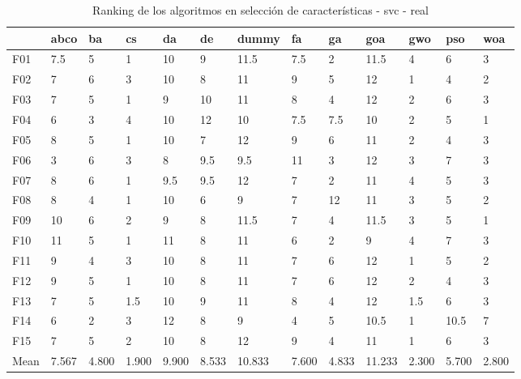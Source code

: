 \begin{table}
    \centering
    \begin{adjustbox}{width=\linewidth}
        \begin{tabular}{lllllllllllll}
            \toprule
            {}   & abco  & ba    & cs    & da    & de    & dummy  & fa    & ga    & goa    & gwo   & pso   & woa   \\
            \midrule
            F01  & 7.5   & 5     & 1     & 10    & 9     & 11.5   & 7.5   & 2     & 11.5   & 4     & 6     & 3     \\
            F02  & 7     & 6     & 3     & 10    & 8     & 11     & 9     & 5     & 12     & 1     & 4     & 2     \\
            F03  & 7     & 5     & 1     & 9     & 10    & 11     & 8     & 4     & 12     & 2     & 6     & 3     \\
            F04  & 6     & 3     & 4     & 10    & 12    & 10     & 7.5   & 7.5   & 10     & 2     & 5     & 1     \\
            F05  & 8     & 5     & 1     & 10    & 7     & 12     & 9     & 6     & 11     & 2     & 4     & 3     \\
            F06  & 3     & 6     & 3     & 8     & 9.5   & 9.5    & 11    & 3     & 12     & 3     & 7     & 3     \\
            F07  & 8     & 6     & 1     & 9.5   & 9.5   & 12     & 7     & 2     & 11     & 4     & 5     & 3     \\
            F08  & 8     & 4     & 1     & 10    & 6     & 9      & 7     & 12    & 11     & 3     & 5     & 2     \\
            F09  & 10    & 6     & 2     & 9     & 8     & 11.5   & 7     & 4     & 11.5   & 3     & 5     & 1     \\
            F10  & 11    & 5     & 1     & 11    & 8     & 11     & 6     & 2     & 9      & 4     & 7     & 3     \\
            F11  & 9     & 4     & 3     & 10    & 8     & 11     & 7     & 6     & 12     & 1     & 5     & 2     \\
            F12  & 9     & 5     & 1     & 10    & 8     & 11     & 7     & 6     & 12     & 2     & 4     & 3     \\
            F13  & 7     & 5     & 1.5   & 10    & 9     & 11     & 8     & 4     & 12     & 1.5   & 6     & 3     \\
            F14  & 6     & 2     & 3     & 12    & 8     & 9      & 4     & 5     & 10.5   & 1     & 10.5  & 7     \\
            F15  & 7     & 5     & 2     & 10    & 8     & 12     & 9     & 4     & 11     & 1     & 6     & 3     \\
            Mean & 7.567 & 4.800 & 1.900 & 9.900 & 8.533 & 10.833 & 7.600 & 4.833 & 11.233 & 2.300 & 5.700 & 2.800 \\
            \bottomrule
        \end{tabular}
    \end{adjustbox}
    \caption{Ranking de los algoritmos en selección de características - svc - real}
    \label{tab:ranking_sel_rate_real_svc}
\end{table}



